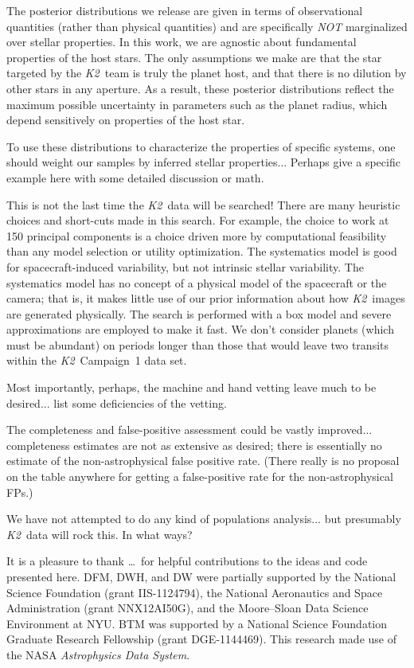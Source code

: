 \documentclass[12pt,preprint]{aastex}
\newcommand{\project}[1]{\textsl{#1}} %
\newcommand{\KT}{\project{K2}}
\begin{document}
The posterior distributions we release are given in terms of observational
quantities (rather than physical quantities) and are specifically \emph{NOT}
marginalized over stellar properties.
In this work, we are agnostic about fundamental properties of the host stars.
The only assumptions we make are that the star targeted by the \KT\
team is truly the planet host, and that there is no dilution by other stars in
any aperture.
As a result, these posterior distributions reflect the maximum possible
uncertainty in parameters such as the planet radius, which depend sensitively
on properties of the host star.

To use these distributions to characterize the properties of specific systems,
one should weight our samples by inferred stellar properties...
Perhaps give a specific example here with some detailed discussion or math.

This is not the last time the \KT\ data will be searched!
There are many heuristic choices and short-cuts made in this search.
For example, the choice to work at 150 principal components is a choice
driven more by computational feasibility than any model selection or
utility optimization.
The systematics model is good for spacecraft-induced variability, but not
intrinsic stellar variability.
The systematics model has no concept of a physical model of the spacecraft or
the camera; that is, it makes little use of our prior information about how
\KT\ images are generated physically.
The search is performed with a box model and severe approximations are employed
to make it fast.
We don't consider planets (which must be abundant) on periods longer
than those that would leave two transits within the \KT\ Campaign~1
data set.

Most importantly, perhaps, the machine and hand vetting leave much to be desired...
list some deficiencies of the vetting.

The completeness and false-positive assessment could be vastly improved...
completeness estimates are not as extensive as desired;
there is essentially no estimate of the non-astrophysical false positive rate.
(There really is no proposal on the table anywhere for getting a false-positive
rate for the non-astrophysical FPs.)

We have not attempted to do any kind of populations analysis...
but presumably \KT\ data will rock this.  In what ways?

\acknowledgments
It is a pleasure to thank
\ldots\
for helpful contributions to the ideas and code presented here.
DFM, DWH, and DW were partially supported by the National Science Foundation (grant IIS-1124794),
the National Aeronautics and Space Administration
(grant NNX12AI50G), and the Moore--Sloan Data Science Environment at NYU.
BTM was supported by a National Science Foundation Graduate Research
Fellowship (grant DGE‐1144469).
This research made use of the NASA \project{Astrophysics Data System}.
\end{document}
